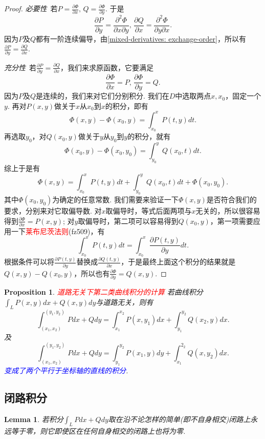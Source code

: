 \documentclass{article}
\newtheorem{lemma}[theorem]{Lemma}
\newtheorem{proposition}[theorem]{Proposition}
\newcommand{\redt}[1]{\textcolor{red}{#1}}
\newcommand{\bluet}[1]{\textcolor{blue}{#1}}
\begin{document}
\begin{proof}
\rm \emph{必要性}\ 若$P = \frac{\partial \Phi}{\partial x},
\,Q = \frac{\partial \Phi}{\partial y}$. 于是
$$
\frac{\partial P}{\partial y} = \frac{\partial^2\Phi}{\partial x\partial y},\,\frac{\partial Q}{\partial x} = \frac{\partial^2\Phi}{\partial y\partial x}.
$$
因为$P$及$Q$都有一阶连续偏导，由\ref{mixed-derivatives: exchange-order}，所以有$\frac{\partial P}{\partial y} = \frac{\partial Q}{\partial x}$.

\emph{充分性}\ 若$\frac{\partial P}{\partial y} = \frac{\partial Q}{\partial x}$，我们来求原函数，它要满足
$$
\frac{\partial \Phi}{\partial x} = P,
\, \frac{\partial \Phi}{\partial y} = Q.
$$
因为$P$及$Q$是连续的，我们来对它们分别积分. 我们在$D$中选取两点$x,x_0$，固定一个$y$. 再对$P(x,y)$做关于$x$从$x_0$到$x$的积分，即有
$$
\Phi(x,y) - \Phi(x_0,y) = \int_{x_0}^{x} P(t,y)dt. 
$$
再选取$y_0$，对$Q(x_0,y)$做关于$y$从$y_0$到$y$的积分，就有
$$
\Phi(x_0,y)-\Phi(x_0,y_0) = \int_{y_0}^{y} Q(x_0,t)dt. 
$$
综上于是有
$$
\Phi(x,y) = \int_{x_0}^{x} P(t,y)dt + \int_{y_0}^{y} Q(x_0,t)dt + \Phi(x_0,y_0).
$$
其中$\Phi(x_0,y_0)$为确定的任意常数. 我们需要来验证一下$\Phi(x,y)$是否符合我们的要求，分别来对它取偏导数. 对$x$取偏导时，等式后面两项与$x$无关的，所以很容易得到$\frac{\partial \Phi}{\partial x} = P(x,y)$; 对$y$取偏导时，第二项可以容易得到$Q(x_0,y)$，第一项需要应用一下\redt{莱布尼茨法则}(fz509)，有
$$
\int_{x_0}^{x}P(t,y)dt = \int_{x_0}^{x} \frac{\partial P(t,y)}{\partial y}dt.
$$ 
根据条件可以将$\frac{\partial P(t,y)}{\partial y}$替换成$\frac{\partial Q(t,y)}{\partial x}$，于是最终上面这个积分的结果就是
$Q(x,y)-Q(x_0,y)$，所以也有$\frac{\partial \Phi}{\partial y} = Q(x,y)$.

\end{proof}

\begin{proposition}
\rm \redt{道路无关下第二类曲线积分的计算} 若曲线积分$\int_L P(x,y)dx + Q(x,y)dy$与道路无关，则有
$$
\int_{(x_1,x_2)}^{(y_1,y_2)} Pdx + Qdy = \int_{x_1}^{x_2} P(x,y_1)dx + \int_{y_1}^{y_2} Q(x_2,y)dx. 
$$ 
及
$$
\int_{(x_1,x_2)}^{(y_1,y_2)} Pdx + Qdy = \int_{y_1}^{y_2} P(x_1,y)dy + \int_{x_1}^{2_2} Q(x,y_2)dx. 
$$
\bluet{变成了两个平行于坐标轴的直线的积分}.
\end{proposition}

\subsection{闭路积分}

\begin{lemma}
\rm 若积分$\int_L Pdx+Qdy$取在沿不论怎样的简单(即不自身相交)闭路上永远等于零，则它即使区在任何自身相交的闭路上也将为零.
\end{lemma}
\end{document}
